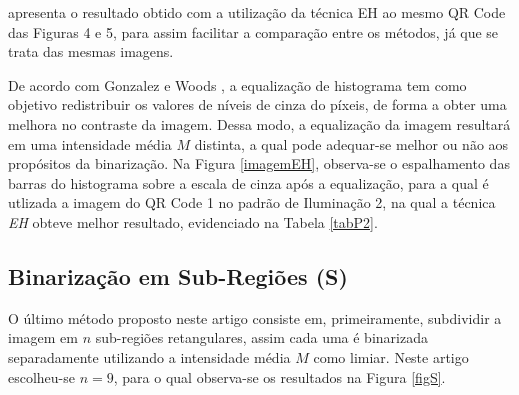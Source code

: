 \documentclass{ceel}
\begin{document}
\begin{multicols}{2}
\begin{minipage}[h]{\columnwidth}
 \hfill 
{}
\vspace{-0.1cm}
\caption{Imagens resultantes da Binarização com Limiar Fixo para o QR Code 3 nos padrões de (a) Iluminação 1, (c) Iluminação 2 e (e) Iluminação 3, com suas respectivas imagens diferença em (b), (d) e (f).} \label{figLF}
\end{minipage}

\vspace{0.4cm}
\noindent apresenta o resultado obtido com a utilização da técnica EH ao mesmo QR Code das Figuras 4 e 5, para assim facilitar a comparação entre os métodos, já que se trata das mesmas imagens.

De acordo com Gonzalez e Woods \cite{gonzales}, a equalização de histograma tem como objetivo redistribuir os valores de níveis de cinza do píxeis, de forma a obter uma melhora no contraste da imagem. Dessa modo, a equalização da imagem resultará em uma intensidade média $M$ distinta, a qual pode adequar-se melhor ou não aos propósitos da binarização. Na Figura \ref{imagemEH}, observa-se o espalhamento das barras do histograma sobre a escala de cinza após a equalização, para a qual é utlizada a imagem do QR Code 1 no padrão de Iluminação 2, na qual a técnica \emph{EH} obteve melhor resultado, evidenciado na Tabela \ref{tabP2}.

\subsection{Binarização em Sub-Regiões (S)} \label{Cdiv} 
O último método proposto neste artigo consiste em, primeiramente, subdividir a imagem em $n$ sub-regiões retangulares, assim cada uma é binarizada separadamente utilizando a intensidade média $M$ como limiar.
Neste artigo escolheu-se $n=9$, para o qual observa-se os resultados na Figura \ref{figS}. 



\end{multicols}
\end{document}
